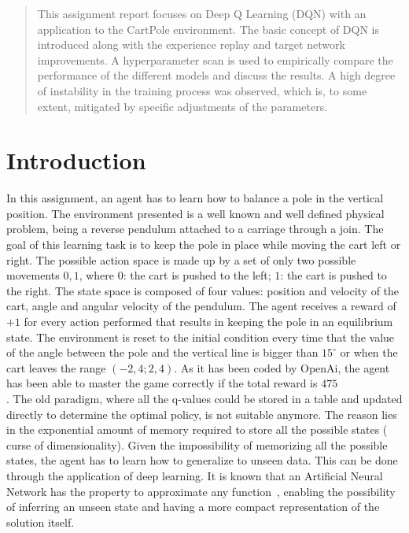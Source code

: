 \documentclass{article}
\begin{document}
\begin{abstract}
This assignment report focuses on Deep Q Learning (DQN)
with an application to the CartPole environment. 
The basic concept of DQN is introduced along with the experience replay 
and target network improvements.
A hyperparameter scan is used to empirically compare the performance of
the different models and discuss the results.    
A high degree of instability in the training process was observed, 
which is, to some extent, mitigated by specific adjustments of the parameters.
\end{abstract}

\section{Introduction}
\label{sec:introduction}
In this assignment, an agent has to learn how to balance a pole in the vertical position.
The environment presented is a well known and well defined physical problem, being a reverse pendulum attached to a carriage through a join.
The goal of this learning task is to keep the pole in place while moving the cart left or right.
The possible action space is made up by a set of only two possible movements ${0,1}$, where $0$: the cart is pushed to the left; $1$: the cart is pushed to the right.
The state space is composed of four values: position and velocity of the cart, angle and angular velocity of the pendulum.
The agent receives a reward of $+1$ for every action performed that results in keeping the pole in an equilibrium state.
The environment is reset to the initial condition every time that the value of the angle between the pole and the vertical line is bigger than $15^\circ$ or when the cart leaves the range $(-2,4;2,4)$.
As it has been coded by OpenAi, the agent has been able to master the game correctly if the total reward is $475$\\.
The old paradigm, where all the q-values could be stored in a table and updated directly to determine the optimal policy, is not suitable anymore.
The reason lies in the exponential amount of memory required to store all the possible states ( curse of dimensionality).
Given the impossibility of memorizing all the possible states, the agent has to learn how to generalize to unseen data.
This can be done through the application of deep learning.
It is known that an Artificial Neural Network has the property to approximate any function~\cite{Cybenko}, enabling the possibility of inferring an unseen state and having a more compact representation of the solution itself.
\end{document}
